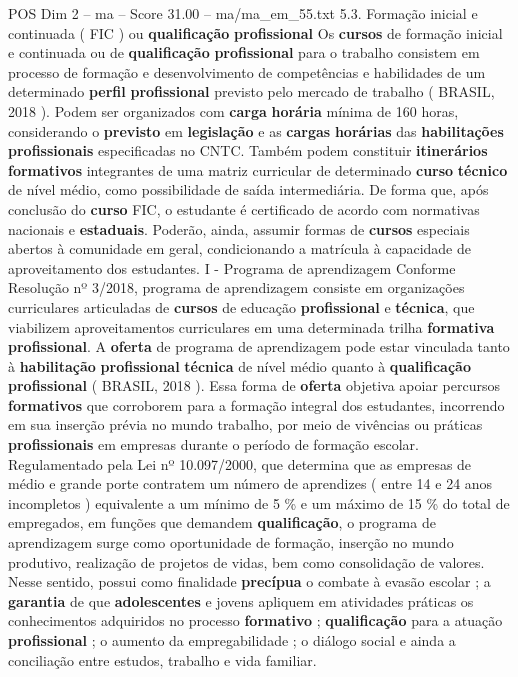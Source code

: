 \begin{textsample}{POS Dim 2 – ma – Score 31.00 – ma/ma\_em\_55.txt}  \label{ex:f2_pos_054}
5.3.
Formação inicial e continuada ( FIC ) ou \textbf{qualificação} \textbf{profissional} Os \textbf{cursos} de formação inicial e continuada ou de \textbf{qualificação} \textbf{profissional} para o trabalho consistem em processo de formação e desenvolvimento de competências e habilidades de um determinado \textbf{perfil} \textbf{profissional} previsto pelo mercado de trabalho ( BRASIL, 2018 ).
Podem ser organizados com \textbf{carga} \textbf{horária} mínima de 160 horas, considerando o \textbf{previsto} em \textbf{legislação} e as \textbf{cargas} \textbf{horárias} das \textbf{habilitações} \textbf{profissionais} especificadas no CNTC.
Também podem constituir \textbf{itinerários} \textbf{formativos} integrantes de uma matriz curricular de determinado \textbf{curso} \textbf{técnico} de nível médio, como possibilidade de saída intermediária.
De forma que, após conclusão do \textbf{curso} FIC, o estudante é certificado de acordo com normativas nacionais e \textbf{estaduais}.
Poderão, ainda, assumir formas de \textbf{cursos} especiais abertos à comunidade em geral, condicionando a matrícula à capacidade de aproveitamento dos estudantes.
I - Programa de aprendizagem Conforme Resolução nº 3/2018, programa de aprendizagem consiste em organizações curriculares articuladas de \textbf{cursos} de educação \textbf{profissional} e \textbf{técnica}, que viabilizem aproveitamentos curriculares em uma determinada trilha \textbf{formativa} \textbf{profissional}.
A \textbf{oferta} de programa de aprendizagem pode estar vinculada tanto à \textbf{habilitação} \textbf{profissional} \textbf{técnica} de nível médio quanto à \textbf{qualificação} \textbf{profissional} ( BRASIL, 2018 ).
Essa forma de \textbf{oferta} objetiva apoiar percursos \textbf{formativos} que corroborem para a formação integral dos estudantes, incorrendo em sua inserção prévia no mundo trabalho, por meio de vivências ou práticas \textbf{profissionais} em empresas durante o período de formação escolar.
Regulamentado pela Lei nº 10.097/2000, que determina que as empresas de médio e grande porte contratem um número de aprendizes ( entre 14 e 24 anos incompletos ) equivalente a um mínimo de 5 \% e um máximo de 15 \% do total de empregados, em funções que demandem \textbf{qualificação}, o programa de aprendizagem surge como oportunidade de formação, inserção no mundo produtivo, realização de projetos de vidas, bem como consolidação de valores.
Nesse sentido, possui como finalidade \textbf{precípua} o combate à evasão escolar ; a \textbf{garantia} de que \textbf{adolescentes} e jovens apliquem em atividades práticas os conhecimentos adquiridos no processo \textbf{formativo} ; \textbf{qualificação} para a atuação \textbf{profissional} ; o aumento da empregabilidade ; o diálogo social e ainda a conciliação entre estudos, trabalho e vida familiar.

\end{textsample}
